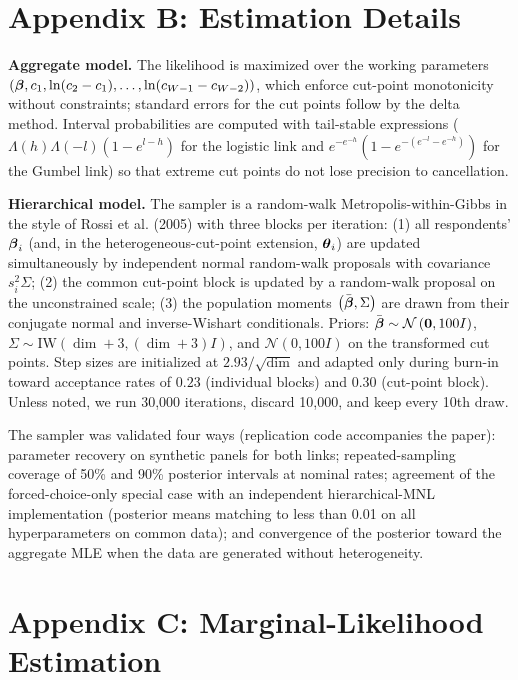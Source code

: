 \documentclass[
  letterpaper,
  DIV=11,
  numbers=noendperiod]{scrartcl}
\theoremstyle{plain}
\theoremstyle{plain}
\theoremstyle{remark}
\begin{document}
\section*{Appendix B: Estimation Details}\label{sec-appendix-estimation}

\textbf{Aggregate model.} The likelihood is maximized over the working
parameters
\(\left( \boldsymbol{\beta}, c_1, \ln(c_2 - c_1), \ldots, \ln(c_{W-1} - c_{W-2}) \right)\),
which enforce cut-point monotonicity without constraints; standard
errors for the cut points follow by the delta method. Interval
probabilities are computed with tail-stable expressions
(\(\Lambda(h)\Lambda(-l)(1 - e^{l-h})\) for the logistic link and
\(e^{-e^{-h}}\left(1 - e^{-(e^{-l} - e^{-h})}\right)\) for the Gumbel
link) so that extreme cut points do not lose precision to cancellation.

\textbf{Hierarchical model.} The sampler is a random-walk
Metropolis-within-Gibbs in the style of Rossi et al. (2005) with three
blocks per iteration: (1) all respondents' \(\boldsymbol{\beta}_i\) (and, in the
heterogeneous-cut-point extension, \(\boldsymbol{\theta}_i\)) are updated
simultaneously by independent normal random-walk proposals with
covariance \(s_i^2 \Sigma\); (2) the common cut-point block is updated
by a random-walk proposal on the unconstrained scale; (3) the population
moments \(\left( \bar{\boldsymbol{\beta}}, \Sigma \right)\) are drawn from their
conjugate normal and inverse-Wishart conditionals. Priors:
\(\bar{\boldsymbol{\beta}} \sim \mathcal{N}\left( \mathbf{0}, 100 I \right)\),
\(\Sigma \sim \text{IW}\left( \dim + 3, (\dim + 3) I \right)\), and
\(\mathcal{N}(0, 100 I)\) on the transformed cut points. Step sizes are
initialized at \(2.93/\sqrt{\dim}\) and adapted only during burn-in
toward acceptance rates of \(0.23\) (individual blocks) and \(0.30\)
(cut-point block). Unless noted, we run 30,000 iterations, discard
10,000, and keep every 10th draw.

The sampler was validated four ways (replication code accompanies the
paper): parameter recovery on synthetic panels for both links;
repeated-sampling coverage of 50\% and 90\% posterior intervals at
nominal rates; agreement of the forced-choice-only special case with an
independent hierarchical-MNL implementation (posterior means matching to
less than 0.01 on all hyperparameters on common data); and convergence
of the posterior toward the aggregate MLE when the data are generated
without heterogeneity.

\section*{Appendix C: Marginal-Likelihood
Estimation}\label{sec-appendix-lmd}
\end{document}
